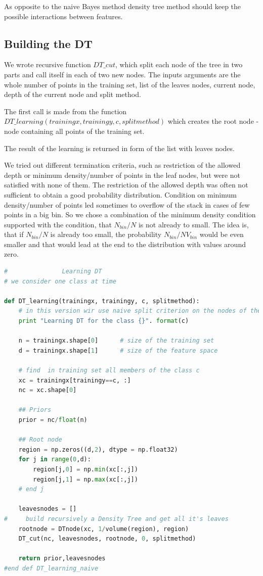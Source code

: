 \documentclass{article}
\begin{document}
As opposite to the naive Bayes method density tree method should keep the possible interactions between features.

\subsection{Building the DT}
We wrote recursive function $DT\_cut$, which split each node of the tree in two parts and call itself in each of two new nodes. The inputs arguments are the whole number of points in the training set, list of the leaves nodes, current node, depth of the current node and split method.

The first call is made from the function $DT\_learning(trainingx, trainingy, c, splitmethod)$ which creates the root node - node containing all points of the training set.

The result of the learning is returned in form of the list with leaves nodes.

We tried out different termination criteria, such as restriction of the allowed depth or minimum density/number of points in the leaf nodes, but were not satisfied with none of them. The restriction of the allowed depth was often not sufficient to obtain a good probability distribution. Condition on minimum density/number of points led sometimes to overflow of the stack in cases of few points in a big bin. So we chose a combination of the minimum density condition supported with the condition, that $N_{bin}/N$ is not already to small. The idea is, that if $N_{bin}/N$ is already too small, the probability $N_{bin}/NV_{bin}$ would be even smaller and that would lead at the end to the distribution with values around zero.

\begin{lstlisting}[language=Python]
#               Learning DT         
# we consider one class at time    

def DT_learning(trainingx, trainingy, c, splitmethod):
    # in this version wir use naive split criterion on the nodes of the DT
    print "Learning DT for the class {}". format(c)
    
    n = trainingx.shape[0]      # size of the training set
    d = trainingx.shape[1]      # size of the feature space
    
    # find  in training set all members of the class c
    xc = trainingx[trainingy==c, :]        
    nc = xc.shape[0]

    ## Priors
    prior = nc/float(n)
    
    ## Root node
    region = np.zeros((d,2), dtype = np.float32)
    for j in range(0,d):
        region[j,0] = np.min(xc[:,j])
        region[j,1] = np.max(xc[:,j])
    # end j   
        
    leavesnodes = []
#     build recursively a Density Tree and get all it's leaves  
    rootnode = DTnode(xc, 1/volume(region), region)
    DT_cut(nc, leavesnodes, rootnode, 0, splitmethod)

    return prior,leavesnodes
#end def DT_learning_naive
\end{lstlisting}
\end{document}
